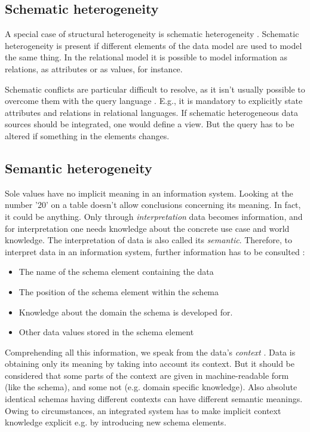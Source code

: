 \subsection{Schematic  heterogeneity}
A special case of structural heterogeneity is schematic heterogeneity \cite[p. 67]{DBLP:books/dp/LeserN2006}. Schematic heterogeneity is present if different elements of the data model are used to model the same thing. In the relational model it is possible to model information as relations, as attributes or as values, for instance. 

Schematic conflicts are particular difficult to resolve, as it isn't usually possible to overcome them with the query language \cite[p. 68]{DBLP:books/dp/LeserN2006}. E.g., it is mandatory to explicitly state attributes and relations in relational languages. If schematic heterogeneous data sources should be integrated, one would define a view. But the query has to be altered if something in the elements changes.

\subsection{Semantic  heterogeneity}
Sole values have no implicit meaning in an information system. Looking at the number '20' on a table doesn't allow conclusions concerning its meaning. In fact, it could be anything. Only through \textit{interpretation} data becomes information, and for interpretation one needs knowledge about the concrete use case and world knowledge. The interpretation of data is also called its \textit{semantic}. Therefore, to interpret data in an information system, further information has to be consulted \cite[p. 73]{DBLP:books/dp/LeserN2006}:
\begin{itemize}
\item The name of the schema element containing the data
\item The position of the schema element within the schema
\item Knowledge about the domain the schema is developed for.
\item Other data values stored in the schema element
\end{itemize}
Comprehending all this information, we speak from the data's \textit{context} \cite[p. 74]{DBLP:books/dp/LeserN2006}. Data is obtaining only its meaning by taking into account its context. But it should be considered that some parts of the context are given in machine-readable form (like the schema), and some not (e.g. domain specific knowledge). Also absolute identical schemas having different contexts can have different semantic meanings. Owing to circumstances, an integrated system has to make implicit context knowledge explicit e.g. by introducing new schema elements.

